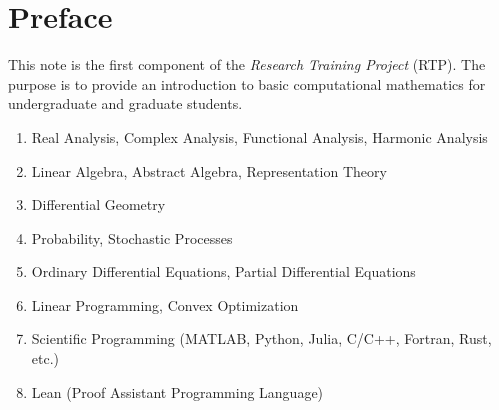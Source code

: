 \chapter*{Preface}

This note is the first component of the \emph{Research Training Project} (RTP).  The purpose is to provide an introduction to basic computational mathematics for undergraduate and graduate students. 

\vspace{2cm}

{}

\begin{enumerate}
    \item Real Analysis, Complex Analysis, Functional Analysis, Harmonic Analysis
    \item Linear Algebra, Abstract Algebra, Representation Theory
    \item Differential Geometry
    \item Probability, Stochastic Processes
    \item Ordinary Differential Equations, Partial Differential Equations 
    \item Linear Programming, Convex Optimization
    \item Scientific Programming (MATLAB, Python, Julia, C/C++, Fortran, Rust, etc.)
    \item Lean (Proof Assistant Programming Language)
\end{enumerate}